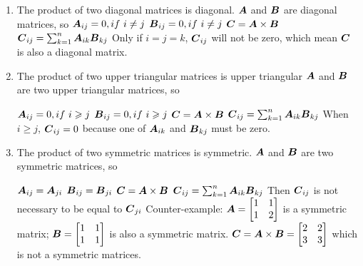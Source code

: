 \documentclass{article}
\begin{document}
\begin{enumerate}%

\item The product of two diagonal matrices is diagonal. \newline
$\boldsymbol{A} $  and  $\boldsymbol{B} $ are diagonal matrices, so \newline 
$\boldsymbol{A}_{ij}= 0, if \ i\neq j $  \newline
$\boldsymbol{B}_{ij}= 0, if \ i\neq j $  \newline
$\boldsymbol{C} = \boldsymbol{A}\times\boldsymbol{B}$ \newline
$\boldsymbol{C}_{ij}=\sum_{k=1}^{n}{\boldsymbol{A}_{ik}\boldsymbol{B}_{kj}} $\newline
Only if $i=j=k$, $\boldsymbol{C}_{ij} $ will not be zero, which mean $\boldsymbol{C}$ is also a diagonal matrix. 

\item The product of two upper triangular matrices is upper triangular
$\boldsymbol{A} $  and  $\boldsymbol{B} $ are two upper triangular matrices, so \newline 

$\boldsymbol{A}_{ij}= 0, if  \ i \geqslant j $  \newline
$\boldsymbol{B}_{ij}= 0, if \ i\geqslant j $  \newline
$\boldsymbol{C} = \boldsymbol{A}\times\boldsymbol{B}$ \newline
$\boldsymbol{C}_{ij}=\sum_{k=1}^{n}{\boldsymbol{A}_{ik}\boldsymbol{B}_{kj}} $\newline
When $i\geqslant j $, $\boldsymbol{C}_{ij}=0 $ because one of $\boldsymbol{A}_{ik} $ and $\boldsymbol{B}_{kj} $ must be zero. 



\item The product of two symmetric matrices is symmetric.
$\boldsymbol{A} $  and  $\boldsymbol{B} $ are two symmetric matrices, so \newline 

$\boldsymbol{A}_{ij}= \boldsymbol{A}_{ji} $  \newline
$\boldsymbol{B}_{ij}= \boldsymbol{B}_{ji}  $  \newline
$\boldsymbol{C} = \boldsymbol{A}\times\boldsymbol{B}$ \newline
$\boldsymbol{C}_{ij}=\sum_{k=1}^{n}{\boldsymbol{A}_{ik}\boldsymbol{B}_{kj}} $\newline
Then $\boldsymbol{C}_{ij} $ is not necessary to be equal to $\boldsymbol{C}_{ji} $\newline
Counter-example: \newline
$\boldsymbol{A}=\begin{bmatrix} 1&1\\1&2 \end{bmatrix}$ is a symmetric matrix; \newline
$\boldsymbol{B}=\begin{bmatrix} 1&1\\1&1 \end{bmatrix}$ is also a symmetric matrix.\newline
$\boldsymbol{C} = \boldsymbol{A}\times\boldsymbol{B} = \begin{bmatrix} 2&2\\3&3 \end{bmatrix} $ which is not a symmetric matrices.  \newline



\end{enumerate}
\end{document}
